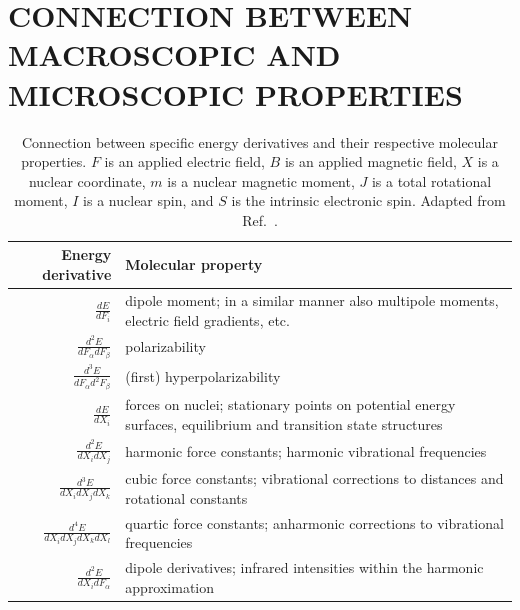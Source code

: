\documentclass[%
class = book,%
crop = false,%
float = true,%
multi = true,%
preview = false,%
]{standalone}
\newcommand{\caps}[1]{\uppercase{#1}}
\begin{document}
\section[\texorpdfstring{\caps{Macroscopic and microscopic response connections}}{Macroscopic and microscopic response connections}]{\texorpdfstring{\caps{Connection between macroscopic and microscopic properties}}{Connection between macroscopic and microscopic properties}}
\label{sec:connection-between-macroscopic-and-microscopic}

\begin{table}
  \centering
  \caption[Connection between energy derivatives and molecular properties]{Connection between specific energy derivatives and their respective molecular properties. \(F\) is an applied electric field, \(B\) is an applied magnetic field, \(X\) is a nuclear coordinate, \(m\) is a nuclear magnetic moment, \(J\) is a total rotational moment, \(I\) is a nuclear spin, and \(S\) is the intrinsic electronic spin. Adapted from Ref.~\parencite{gauss2000}.\label{tab:gauss}}
  \begin{singlespace}
    \begin{tabulary}{0.85\textwidth}{rL}
      \toprule
      \textbf{Energy derivative} & \textbf{Molecular property} \\
      \midrule
      \(\frac{dE}{dF_{i}}\)                          & dipole moment; in a similar manner also multipole moments, electric field gradients, etc. \\
      \(\frac{d^{2}E}{dF_{\alpha}dF_{\beta}}\)       & polarizability \\
      \(\frac{d^{3}E}{dF_{\alpha}d^{2}F_{\beta}}\)   & (first) hyperpolarizability \\
      \(\frac{dE}{dX_{i}}\)                          & forces on nuclei; stationary points on potential energy surfaces, equilibrium and transition state structures \\
      \(\frac{d^{2}E}{dX_{i}dX_{j}}\)                & harmonic force constants; harmonic vibrational frequencies \\
      \(\frac{d^{3}E}{dX_{i}dX_{j}dX_{k}}\)          & cubic force constants; vibrational corrections to distances and rotational constants \\
      \(\frac{d^{4}E}{dX_{i}dX_{j}dX_{k}dX_{l}}\)    & quartic force constants; anharmonic corrections to vibrational frequencies \\
      \(\frac{d^{2}E}{dX_{i}dF_{\alpha}}\)           & dipole derivatives; infrared intensities within the harmonic approximation \\

\end{tabulary}
\end{singlespace}
\end{table}
\end{document}
